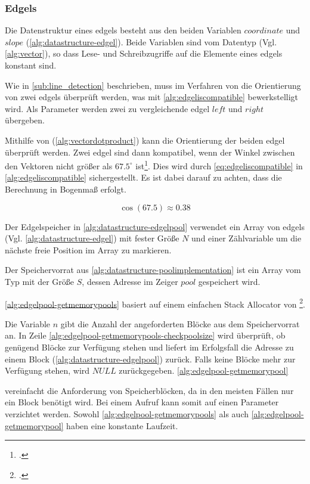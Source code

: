 \subsubsection{Edgels} %
\label{sub:datenstruktur-edgels}

Die Datenstruktur eines \glspl{edgel} besteht aus den beiden Variablen $\mathit{coordinate}$ und $\mathit{slope}$
 (\autoref{alg:datastructure-edgel}). Beide Variablen sind vom Datentyp  (Vgl.
 \autoref{alg:vector}), so dass Lese- und Schreibzugriffe auf die Elemente eines \glspl{edgel} konstant sind.


Wie in \autoref{sub:line_detection} beschrieben, muss im Verfahren von \citeauthor{hirzer08} die Orientierung von zwei
 \glspl{edgel} überprüft werden, was mit \autoref{alg:edgeliscompatible} bewerkstelligt wird. Als Parameter werden
 zwei zu vergleichende \gls{edgel} $\mathit{left}$ und $\mathit{right}$ übergeben.

Mithilfe von  (\autoref{alg:vectordotproduct}) kann die Orientierung der beiden \gls{edgel}
 überprüft werden. Zwei \gls{edgel} sind dann kompatibel, wenn der Winkel zwischen den Vektoren nicht größer als
 $67.5^\circ$ ist\footcite[Vgl.][S.~417]{clarke96}. Dies wird durch \autoref{eq:edgeliscompatible} in
 \autoref{alg:edgeliscompatible} sichergestellt. Es ist dabei darauf zu achten, dass die Berechnung in Bogenmaß
 erfolgt.

\begin{equation}
	\label{eq:edgeliscompatible}
	\cos \left(67.5\right) \approx 0.38
\end{equation}

Der Edgelspeicher in \autoref{alg:datastructure-edgelpool} verwendet ein Array von \glspl{edgel}
 (Vgl. \autoref{alg:datastructure-edgel}) mit fester Größe $N$ und einer Zählvariable um die nächste freie Position im
 Array zu markieren.

Der Speichervorrat aus \autoref{alg:datastructure-poolimplementation} ist ein Array vom Typ
  mit der Größe $S$, dessen Adresse im Zeiger $\mathit{pool}$ gespeichert wird.

\autoref{alg:edgelpool-getmemorypools} basiert auf einem einfachen Stack Allocator von
 \citeauthor{kr}\footcite[Vgl.][S.~100--104]{kr}.

Die Variable $n$ gibt die Anzahl der angeforderten Blöcke aus dem Speichervorrat an. In Zeile
 \ref{alg:edgelpool-getmemorypools-checkpoolsize} wird überprüft, ob genügend Blöcke zur Verfügung stehen und liefert
 im Erfolgsfall die Adresse zu einem Block (\autoref{alg:datastructure-edgelpool}) zurück. Falls keine Blöcke mehr zur
 Verfügung stehen, wird $\mathit{NULL}$ zurückgegeben. \autoref{alg:edgelpool-getmemorypool}

 vereinfacht die Anforderung von Speicherblöcken, da in den meisten Fällen nur ein Block benötigt wird. Bei einem
 Aufruf kann somit auf einen Parameter verzichtet werden. Sowohl \autoref{alg:edgelpool-getmemorypools} als auch
 \autoref{alg:edgelpool-getmemorypool} haben eine konstante Laufzeit.

